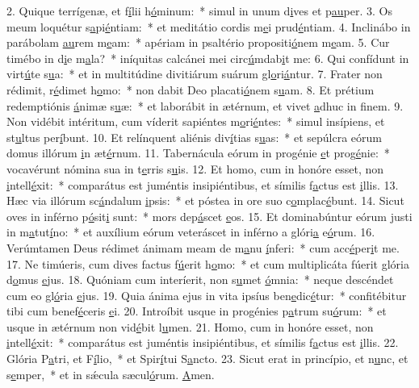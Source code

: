 2. Quique terrígenæ, et f\uline{í}lii h\uline{ó}minum:~* simul in unum d\uline{i}ves et p\uline{au}per.
3. Os meum loquétur s\uline{a}pi\uline{é}ntiam:~* et meditátio cordis m\uline{e}i prud\uline{é}ntiam.
4. Inclinábo in parábolam \uline{au}rem m\uline{e}am:~* apériam in psaltério propositi\uline{ó}nem m\uline{e}am.
5. Cur timébo in d\uline{i}e m\uline{a}la?~* iníquitas calcánei mei circ\uline{ú}mdab\uline{i}t me:
6. Qui confídunt in virt\uline{ú}te s\uline{u}a:~* et in multitúdine divitiárum suárum gl\uline{o}ri\uline{á}ntur.
7. Frater non rédimit, r\uline{é}dimet h\uline{o}mo:~* non dabit Deo placati\uline{ó}nem s\uline{u}am.
8. Et prétium redemptiónis \uline{á}nimæ s\uline{u}æ:~* et laborábit in ætérnum, et vivet \uline{a}dhuc in f\uline{i}nem.
9. Non vidébit intéritum, cum víderit sapiéntes m\uline{o}ri\uline{é}ntes:~* simul insípiens, et st\uline{u}ltus per\uline{í}bunt.
10. Et relínquent aliénis div\uline{í}tias s\uline{u}as:~* et sepúlcra eórum domus illórum \uline{i}n æt\uline{é}rnum.
11. Tabernácula eórum in progénie \uline{e}t prog\uline{é}nie:~* vocavérunt nómina sua in t\uline{e}rris s\uline{u}is.
12. Et homo, cum in honóre esset, non \uline{i}ntell\uline{é}xit:~* comparátus est juméntis insipiéntibus, et símilis f\uline{a}ctus est \uline{i}llis.
13. Hæc via illórum sc\uline{á}ndalum \uline{i}psis:~* et póstea in ore suo c\uline{o}mplac\uline{é}bunt.
14. Sicut oves in inférno p\uline{ó}sit\uline{i} sunt:~* mors dep\uline{á}scet \uline{e}os.
15. Et dominabúntur eórum justi in m\uline{a}tut\uline{í}no:~* et auxílium eórum veteráscet in inférno a glóri\uline{a} e\uline{ó}rum.
16. Verúmtamen Deus rédimet ánimam meam de m\uline{a}nu \uline{í}nferi:~* cum acc\uline{é}per\uline{i}t me.
17. Ne timúeris, cum dives factus f\uline{ú}erit h\uline{o}mo:~* et cum multiplicáta fúerit glória d\uline{o}mus \uline{e}jus.
18. Quóniam cum interíerit, non s\uline{u}met \uline{ó}mnia:~* neque descéndet cum eo gl\uline{ó}ria \uline{e}jus.
19. Quia ánima ejus in vita ipsíus ben\uline{e}dic\uline{é}tur:~* confitébitur tibi cum benef\uline{é}ceris \uline{e}i.
20. Introíbit usque in progénies p\uline{a}trum su\uline{ó}rum:~* et usque in ætérnum non vid\uline{é}bit l\uline{u}men.
21. Homo, cum in honóre esset, non \uline{i}ntell\uline{é}xit:~* comparátus est juméntis insipiéntibus, et símilis f\uline{a}ctus est \uline{i}llis.
22. Glória P\uline{a}tri, et F\uline{í}lio,~* et Spir\uline{í}tui S\uline{a}ncto.
23. Sicut erat in princípio, et n\uline{u}nc, et s\uline{e}mper,~* et in sǽcula sæcul\uline{ó}rum. \uline{A}men.

